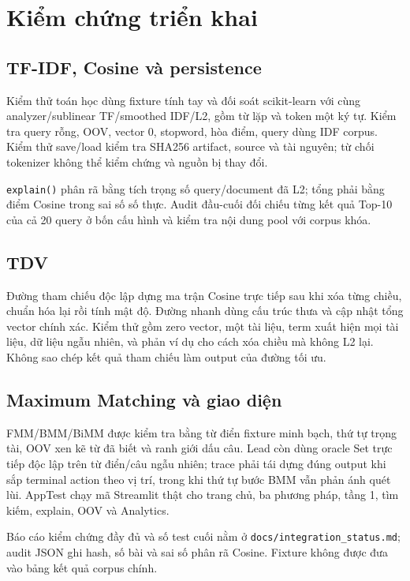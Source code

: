\section{Kiểm chứng triển khai}

\subsection{TF-IDF, Cosine và persistence}

Kiểm thử toán học dùng fixture tính tay và đối soát scikit-learn với cùng
analyzer/sublinear TF/smoothed IDF/L2, gồm từ lặp và token một ký tự.
Kiểm tra query rỗng, OOV, vector 0, stopword, hòa điểm, query dùng IDF corpus.
Kiểm thử save/load kiểm tra SHA256 artifact, source và tài nguyên; từ chối
tokenizer không thể kiểm chứng và nguồn bị thay đổi.

\texttt{explain()} phân rã bằng tích trọng số query/document đã L2; tổng phải
bằng điểm Cosine trong sai số số thực. Audit đầu-cuối đối chiếu từng kết quả
Top-10 của cả 20 query ở bốn cấu hình và kiểm tra nội dung pool với corpus khóa.

\subsection{TDV}

Đường tham chiếu độc lập dựng ma trận Cosine trực tiếp sau khi xóa từng chiều,
chuẩn hóa lại rồi tính mật độ. Đường nhanh dùng cấu trúc thưa và cập nhật tổng
vector chính xác. Kiểm thử gồm zero vector, một tài liệu, term xuất hiện mọi
tài liệu, dữ liệu ngẫu nhiên, và phản ví dụ cho cách xóa chiều mà không L2 lại.
Không sao chép kết quả tham chiếu làm output của đường tối ưu.

\subsection{Maximum Matching và giao diện}

FMM/BMM/BiMM được kiểm tra bằng từ điển fixture minh bạch, thứ tự trọng tài,
OOV xen kẽ từ đã biết và ranh giới dấu câu. Lead còn dùng oracle Set trực tiếp
độc lập trên từ điển/câu ngẫu nhiên; trace phải tái dựng đúng output khi sắp
terminal action theo vị trí, trong khi thứ tự bước BMM vẫn phản ánh quét lùi.
AppTest chạy mã Streamlit thật cho trang chủ, ba phương pháp, tầng 1, tìm kiếm,
explain, OOV và Analytics.

Báo cáo kiểm chứng đầy đủ và số test cuối nằm ở
\texttt{docs/integration\_status.md}; audit JSON ghi hash, số bài và sai số
phân rã Cosine. Fixture không được đưa vào bảng kết quả corpus chính.

